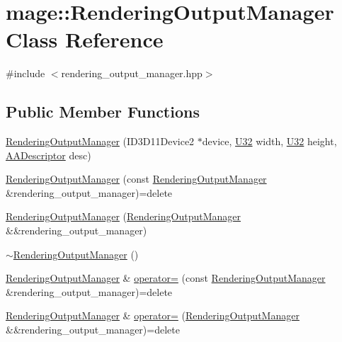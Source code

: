 \hypertarget{classmage_1_1_rendering_output_manager}{}\section{mage\+:\+:Rendering\+Output\+Manager Class Reference}
\label{classmage_1_1_rendering_output_manager}


{\ttfamily \#include $<$rendering\+\_\+output\+\_\+manager.\+hpp$>$}

\subsection*{Public Member Functions}
\begin{DoxyCompactItemize}
\item 
\hyperlink{classmage_1_1_rendering_output_manager_a097d6a2fd6b81f38eb2d4b54bf0c2786}{Rendering\+Output\+Manager} (I\+D3\+D11\+Device2 $\ast$device, \hyperlink{namespacemage_a41c104c036fba3756a74e19f793eeaa1}{U32} width, \hyperlink{namespacemage_a41c104c036fba3756a74e19f793eeaa1}{U32} height, \hyperlink{namespacemage_a86cd40b8f2f42ca4d616cc6ec665a7f2}{A\+A\+Descriptor} desc)
\item 
\hyperlink{classmage_1_1_rendering_output_manager_aba36b667b7f34cc23858050a7713f4fa}{Rendering\+Output\+Manager} (const \hyperlink{classmage_1_1_rendering_output_manager}{Rendering\+Output\+Manager} \&rendering\+\_\+output\+\_\+manager)=delete
\item 
\hyperlink{classmage_1_1_rendering_output_manager_a2ffb191fb849e740921c42638e3ea507}{Rendering\+Output\+Manager} (\hyperlink{classmage_1_1_rendering_output_manager}{Rendering\+Output\+Manager} \&\&rendering\+\_\+output\+\_\+manager)
\item 
\hyperlink{classmage_1_1_rendering_output_manager_ac6c1b4ce353870ea603982623962b2f4}{$\sim$\+Rendering\+Output\+Manager} ()
\item 
\hyperlink{classmage_1_1_rendering_output_manager}{Rendering\+Output\+Manager} \& \hyperlink{classmage_1_1_rendering_output_manager_a486005f24c4ba471522e827574099c0b}{operator=} (const \hyperlink{classmage_1_1_rendering_output_manager}{Rendering\+Output\+Manager} \&rendering\+\_\+output\+\_\+manager)=delete
\item 
\hyperlink{classmage_1_1_rendering_output_manager}{Rendering\+Output\+Manager} \& \hyperlink{classmage_1_1_rendering_output_manager_a1e3ae29b6a7b888ba1cf5b93840d09d1}{operator=} (\hyperlink{classmage_1_1_rendering_output_manager}{Rendering\+Output\+Manager} \&\&rendering\+\_\+output\+\_\+manager)=delete

\end{DoxyCompactItemize}
